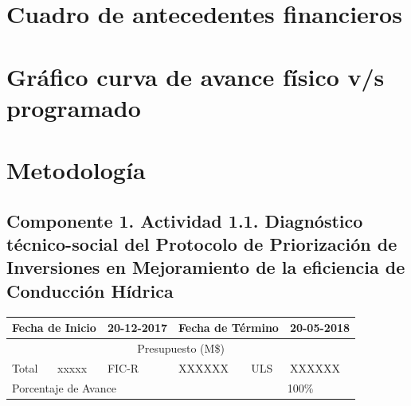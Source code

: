 \documentclass[]{article}
\begin{document}
\clearpage
\section{Cuadro de antecedentes financieros}

\clearpage
\section{Gráfico curva de avance físico v/s programado}

\clearpage
\section{Metodología}

\subsection{Componente 1. Actividad 1.1. Diagnóstico técnico-social del Protocolo de Priorización de Inversiones en Mejoramiento de la eficiencia de Conducción Hídrica}

\begin{table}[!htb]
\centering
\begin{tabular}{|p{2cm}|p{2cm}|p{2cm}|p{2cm}|p{2cm}|p{2cm}|}
    \hline
    \multicolumn{2}{|l|}{Fecha de Inicio} & 20-12-2017 & \multicolumn{2}{l|}{Fecha de Término} & 20-05-2018\\
    \hline
    \multicolumn{6}{|c|}{Presupuesto (M\$)}\\
    \hline
    Total & xxxxx & FIC-R & XXXXXX & ULS & XXXXXX\\
    \hline
    \multicolumn{4}{|l|}{Porcentaje de Avance} & \multicolumn{2}{c|}{100\%}\\
    \hline
\end{tabular}
\end{table}
\end{document}
